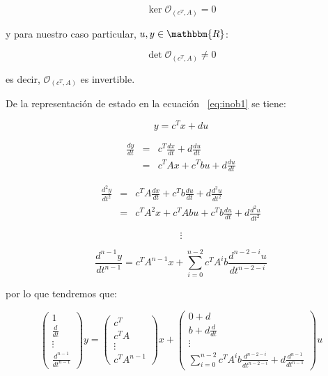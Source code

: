 		\begin{equation*}
			\ker{\mathcal{O}_{(c^T, A)}} = {0}
		\end{equation*}

		y para nuestro caso particular, $u, y \in \mathbbm{R}$:

		\begin{equation*}
			\det{\mathcal{O}_{(c^T, A)}} \ne 0
		\end{equation*}

		es decir, $\mathcal{O}_{(c^T, A)}$ es invertible.

		De la representación de estado en la ecuación ~\ref{eq:inob1} se tiene:

		\begin{equation*}
			y = c^T x + d u
		\end{equation*}

		\begin{eqnarray*}
			\frac{dy}{dt} & = & c^T \frac{dx}{dt} + d \frac{du}{dt} \\
			& = & c^T A x + c^T b u + d \frac{du}{dt}
		\end{eqnarray*}

		\begin{eqnarray*}
			\frac{d^2y}{dt^2} & = & c^T A \frac{dx}{dt} + c^T b \frac{du}{dt} + d \frac{d^2u}{dt^2} \\
			& = & c^T A^2 x + c^T A b u + c^T b \frac{du}{dt} + d \frac{d^2u}{dt^2}
		\end{eqnarray*}

		\begin{equation*}
			\vdots
		\end{equation*}

		\begin{equation*}
			\frac{d^{n-1}y}{dt^{n-1}} = c^T A^{n-1} x + \sum_{i=0}^{n-2} c^T A^i b \frac{d^{n-2-i}u}{dt^{n-2-i}}
		\end{equation*}

		por lo que tendremos que:

		\begin{equation*}
			\begin{pmatrix}
				1 \\
				\frac{d}{dt} \\
				\vdots \\
				\frac{d^{n-1}}{dt^{n-1}}
			\end{pmatrix} y =
			\begin{pmatrix}
				c^T \\
				c^T A \\
				\vdots \\
				c^T A^{n-1}
			\end{pmatrix} x +
			\begin{pmatrix}
				0 + d \\
				b + d \frac{d}{dt} \\
				\vdots \\
				\sum_{i=0}^{n-2} c^T A^i b \frac{d^{n-2-i}}{dt^{n-2-i}} + d \frac{d^{n-1}}{dt^{n-1}}
			\end{pmatrix} u
		\end{equation*}

